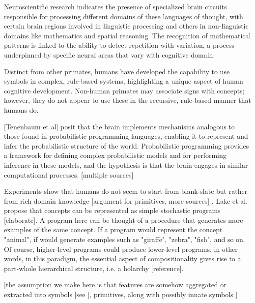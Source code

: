 Neuroscientific research indicates the presence of specialized brain circuits responsible for processing different domains of these languages of thought, with certain brain regions involved in linguistic processing and others in non-linguistic domains like mathematics and spatial reasoning. The recognition of mathematical patterns is linked to the ability to detect repetition with variation, a process underpinned by specific neural areas that vary with cognitive domain.

Distinct from other primates, humans have developed the capability to use symbols in complex, rule-based systems, highlighting a unique aspect of human cognitive development. Non-human primates may associate signs with concepts; however, they do not appear to use these in the recursive, rule-based manner that humans do.

[Tenenbaum et al] posit that the brain implements mechanisms analogous to those found in probabilistic programming languages, enabling it to represent and infer the probabilistic structure of the world. Probabilistic programming provides a framework for defining complex probabilistic models and for performing inference in these models, and the hypothesis is that the brain engages in similar computational processes. [multiple sources]

Experiments show that humans do not seem to start from blank-slate but rather from rich domain knowledge [argument for primitives, more sources] \cite{lake_building_2016}. Lake et al. propose that concepts can be represented as simple stochastic programs [elaborate]. A program here can be thought of a procedure that generates more examples of the same concept. If a program would represent the concept "animal", if would generate examples such as "giraffe", "zebra", "fish", and so on. Of course, higher-level programs could produce lower-level programs, in other words, in this paradigm, the essential aspect of compositionality gives rise to a part-whole hierarchical structure, i.e. a holarchy [reference].

[the assumption we make here is that features are somehow aggregated or extracted into symbols [see \cite{garcez_neurosymbolic_2020}], primitives, along with possibly innate symbols \cite{Lake_Ullman_Tenenbaum_Gershman_2017}] 


